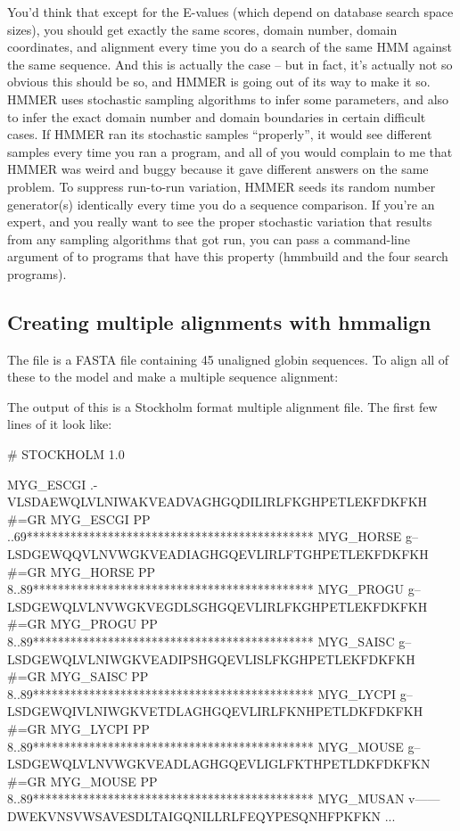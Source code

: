 You'd think that except for the E-values (which depend on database
search space sizes), you should get exactly the same scores, domain
number, domain coordinates, and alignment every time you do a search
of the same HMM against the same sequence. And this is actually the
case -- but in fact, it's actually not so obvious this should be so,
and HMMER is going out of its way to make it so. HMMER uses stochastic
sampling algorithms to infer some parameters, and also to infer the
exact domain number and domain boundaries in certain difficult
cases. If HMMER ran its stochastic samples ``properly'', it would see
different samples every time you ran a program, and all of you would
complain to me that HMMER was weird and buggy because it gave
different answers on the same problem. To suppress run-to-run
variation, HMMER seeds its random number generator(s) identically
every time you do a sequence comparison. If you're an expert, and you
really want to see the proper stochastic variation that results from
any sampling algorithms that got run, you can pass a command-line
argument of  to programs that have this property
(hmmbuild and the four search programs).


\subsection{Creating multiple alignments with hmmalign}

The file  is a FASTA file containing 45
unaligned globin sequences. To align all of these to the
 model and make a multiple sequence alignment:


The output of this is a Stockholm format multiple alignment file. The
first few lines of it look like:

\begin{sreoutput}
# STOCKHOLM 1.0

MYG_ESCGI          .-VLSDAEWQLVLNIWAKVEADVAGHGQDILIRLFKGHPETLEKFDKFKH
#=GR MYG_ESCGI  PP ..69**********************************************
MYG_HORSE          g--LSDGEWQQVLNVWGKVEADIAGHGQEVLIRLFTGHPETLEKFDKFKH
#=GR MYG_HORSE  PP 8..89*********************************************
MYG_PROGU          g--LSDGEWQLVLNVWGKVEGDLSGHGQEVLIRLFKGHPETLEKFDKFKH
#=GR MYG_PROGU  PP 8..89*********************************************
MYG_SAISC          g--LSDGEWQLVLNIWGKVEADIPSHGQEVLISLFKGHPETLEKFDKFKH
#=GR MYG_SAISC  PP 8..89*********************************************
MYG_LYCPI          g--LSDGEWQIVLNIWGKVETDLAGHGQEVLIRLFKNHPETLDKFDKFKH
#=GR MYG_LYCPI  PP 8..89*********************************************
MYG_MOUSE          g--LSDGEWQLVLNVWGKVEADLAGHGQEVLIGLFKTHPETLDKFDKFKN
#=GR MYG_MOUSE  PP 8..89*********************************************
MYG_MUSAN          v------DWEKVNSVWSAVESDLTAIGQNILLRLFEQYPESQNHFPKFKN
...
\end{sreoutput}


